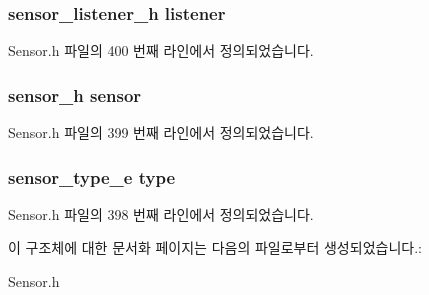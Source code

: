 \hypertarget{struct___light_extend_aa977dfb866b24fd7d9a20a9a01b2fd1f}{
\subsubsection[{listener}]{\setlength{\rightskip}{0pt plus 5cm}sensor\-\_\-listener\-\_\-h listener}}\label{struct___light_extend_aa977dfb866b24fd7d9a20a9a01b2fd1f}


Sensor.\-h 파일의 400 번째 라인에서 정의되었습니다.

\hypertarget{struct___light_extend_a5bae9b7801bc3808411925cde81d3f26}{
\subsubsection[{sensor}]{\setlength{\rightskip}{0pt plus 5cm}sensor\-\_\-h sensor}}\label{struct___light_extend_a5bae9b7801bc3808411925cde81d3f26}


Sensor.\-h 파일의 399 번째 라인에서 정의되었습니다.

\hypertarget{struct___light_extend_abffb09766da2fc510a79bb51f82a36e1}{
\subsubsection[{type}]{\setlength{\rightskip}{0pt plus 5cm}sensor\-\_\-type\-\_\-e type}}\label{struct___light_extend_abffb09766da2fc510a79bb51f82a36e1}


Sensor.\-h 파일의 398 번째 라인에서 정의되었습니다.



이 구조체에 대한 문서화 페이지는 다음의 파일로부터 생성되었습니다.\-:\begin{DoxyCompactItemize}
\item 
Sensor.\-h\end{DoxyCompactItemize}
